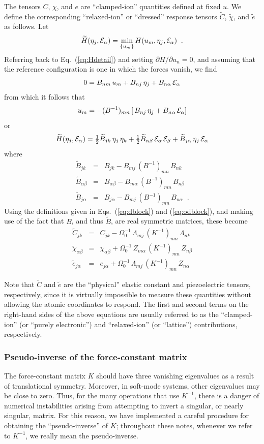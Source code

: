 \documentclass[11pt,fleqn]{article}
\def\bea{\begin{eqnarray}}
\def\nn{\nonumber\\}
\def\eea{\end{eqnarray}}
\def\beq{\begin{equation}}
\def\eeq{\end{equation}}
\def\wt#1{\widetilde{#1}}
\def\E{{\cal E}}
\def\Oo{\Omega_0}
\def\half{{\textstyle{1\over2}}}
\begin{document}
The tensors $C$, $\chi$, and $e$ are ``clamped-ion''
quantities defined at fixed $u$.  We define the corresponding
``relaxed-ion'' or ``dressed'' response tensors $\wt{C}$,
$\wt{\chi}$, and $\wt{e}$ as follows.  Let
%
\beq
\wt{H}(\eta_j,\E_\alpha)=\min_{\{u_m\}} H(u_m,\eta_j,\E_\alpha)
\;\;.
\eeq
%
Referring back to Eq.~(\ref{eq:Hdetail}) and setting $\partial
H/\partial u_n=0$, and assuming that the reference configuration is
one in which the forces vanish, we find
%
\[ 0=B_{nm}\,u_m+B_{nj}\,\eta_j+B_{n\alpha}\,\E_\alpha \]
%
from which it follows that
%
\[ u_m=-(B^{-1})_{mn} \,[\,B_{nj}\,\eta_j+B_{n\alpha}\,\E_\alpha] \]
%
or
%
\beq
\wt{H}(\eta_j,\E_\alpha)=\half\wt{B}_{jk}\,\eta_j\,\eta_k +
  \half\wt{B}_{\alpha\beta}\,\E_\alpha\,\E_\beta +
  \wt{B}_{j\alpha}\,\eta_j\,\E_\alpha
\eeq
%
where
%
\bea
\wt{B}_{jk} &=& B_{jk}-B_{mj}\,(B^{-1})_{mn}\,B_{nk}
\nn
\wt{B}_{\alpha\beta} &=& B_{\alpha\beta}-B_{m\alpha}\,(B^{-1})_{mn}\,B_{n\beta}
\nn
\wt{B}_{j\alpha} &=& B_{j\alpha}-B_{mj}\,(B^{-1})_{mn}\,B_{n\alpha}
\;\;.
\eea
%
Using the definitions given in Eqs.~(\ref{eq:dblock}) and (\ref{eq:odblock}),
and making use of the fact that $B$, and thus $\wt{B}$, are real
symmetric matrices, these become
%
\bea
\wt{C}_{jk} &=& C_{jk}-\Oo^{-1}\,\Lambda_{mj}\,(K^{-1})_{mn}\,\Lambda_{nk}
\label{eq:ctilde}
\\
\wt{\chi}_{\alpha\beta} &=& \chi_{\alpha\beta}
   + \Oo^{-1}\,Z_{m\alpha}\,(K^{-1})_{mn}\,Z_{n\beta}
\label{eq:chitilde}
\\
\wt{e}_{j\alpha} &=& e_{j\alpha}+\Oo^{-1}\,\Lambda_{mj}\,(K^{-1})_{mn}\,Z_{n\alpha}
\label{eq:etilde}
\eea
%

Note that $\wt{C}$ and $\wt{e}$ are the ``physical'' elastic constant
and piezoelectric tensors, respectively, since it is virtually
impossible to measure these quantities without allowing the atomic
coordinates to respond.
The first and second terms on the right-hand sides of the above
equations are usually referred to as the ``clamped-ion'' (or
``purely electronic'') and ``relaxed-ion'' (or ``lattice'')
contributions, respectively.

\subsubsection{Pseudo-inverse of the force-constant matrix}
\label{sec:pseudoinverse}

The force-constant matrix $K$ should have three vanishing
eigenvalues as a result of translational symmetry.  Moreover,
in soft-mode systems, other eigenvalues may be close to zero.
Thus, for the many operations that use $K^{-1}$, there is a
danger of numerical instabilities arising from attempting to
invert a singular, or nearly singular, matrix.  For this reason,
we have implemented a careful procedure for obtaining the
``pseudo-inverse'' of $K$; throughout these notes, whenever
we refer to $K^{-1}$, we really mean the pseudo-inverse.
\end{document}
